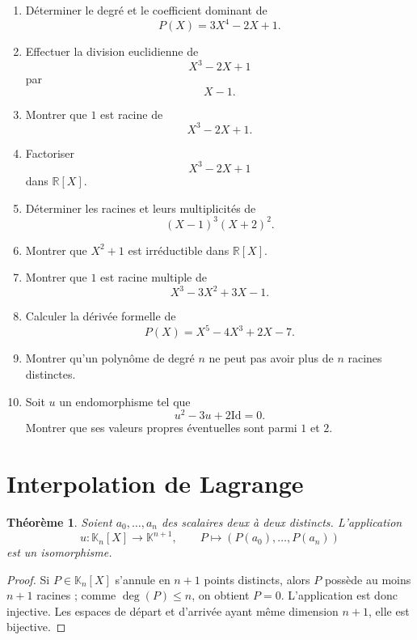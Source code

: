 \documentclass[11pt,a4paper]{article}
\newtheorem{theoreme}[definition]{Théorème}
\theoremstyle{remark}
\newcommand{\R}{\mathbb{R}}
\newcommand{\K}{\mathbb{K}}
\newcommand{\id}{\mathrm{Id}}
\begin{document}
\begin{enumerate}[label=\textbf{Exercice \arabic*.}]
    \item Déterminer le degré et le coefficient dominant de
    \[
    P(X)=3X^4-2X+1.
    \]

    \item Effectuer la division euclidienne de
    \[
    X^3-2X+1
    \]
    par
    \[
    X-1.
    \]

    \item Montrer que \(1\) est racine de
    \[
    X^3-2X+1.
    \]

    \item Factoriser
    \[
    X^3-2X+1
    \]
    dans \(\R[X]\).

    \item Déterminer les racines et leurs multiplicités de
    \[
    (X-1)^3(X+2)^2.
    \]

    \item Montrer que \(X^2+1\) est irréductible dans \(\R[X]\).

    \item Montrer que \(1\) est racine multiple de
    \[
    X^3-3X^2+3X-1.
    \]

    \item Calculer la dérivée formelle de
    \[
    P(X)=X^5-4X^3+2X-7.
    \]

    \item Montrer qu’un polynôme de degré \(n\) ne peut pas avoir plus de \(n\) racines distinctes.

    \item Soit \(u\) un endomorphisme tel que
    \[
    u^2-3u+2\id=0.
    \]
    Montrer que ses valeurs propres éventuelles sont parmi \(1\) et \(2\).
\end{enumerate}

\section{Interpolation de Lagrange}

\begin{theoreme}
Soient \(a_0,\dots,a_n\) des scalaires deux à deux distincts.
L’application
\[
u:\K_n[X]\to\K^{n+1},\qquad P\mapsto (P(a_0),\dots,P(a_n))
\]
est un isomorphisme.
\end{theoreme}

\begin{proof}
Si \(P\in\K_n[X]\) s’annule en \(n+1\) points distincts, alors \(P\) possède au moins \(n+1\) racines ; comme \(\deg(P)\le n\), on obtient \(P=0\).
L’application est donc injective. Les espaces de départ et d’arrivée ayant même dimension \(n+1\), elle est bijective.
\end{proof}
\end{document}
